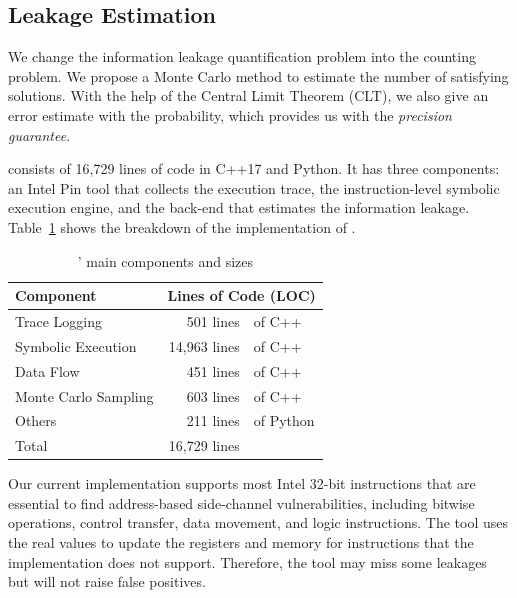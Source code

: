 \subsection{Leakage Estimation} 
We change the information leakage quantification problem into the counting problem. We propose a
Monte Carlo method to estimate the number of satisfying solutions. With the help of the Central Limit Theorem (CLT), we also give an error
estimate with the probability, which provides us with the \emph{precision guarantee}.

\tool{} consists of 16,729 lines of code in C++17 and Python. It has three components: an Intel Pin tool that collects the execution trace, the
instruction-level symbolic execution engine, and the back-end that estimates the information leakage. Table~\ref{tbl:implementation} shows the breakdown of the implementation of \tool{}.

\begin{table}[ht]
    \centering
    \caption{\tool{}' main components and sizes}\label{tbl:implementation}
    \begin{tabular}{lr@{~}@{}l}
        \hline
        Component            & \multicolumn{2}{c}{Lines of Code (LOC)}             \\ \hline
        Trace Logging        & 501 lines                               & of C++    \\
        Symbolic Execution   & 14,963 lines                            & of C++    \\
        Data Flow            & 451 lines                               & of C++    \\
        Monte Carlo Sampling & 603 lines                               & of C++    \\
        Others               & 211 lines                               & of Python \\ \hline
        Total                & 16,729 lines                            &           \\\hline
    \end{tabular}
\end{table}

Our current implementation supports most Intel 32-bit instructions that are essential to find address-based side-channel vulnerabilities, including bitwise operations, control transfer, data movement, and logic instructions. The tool uses the real values to update the registers and memory for instructions that the implementation does not support. Therefore, the tool may miss some leakages but will not raise false positives.

